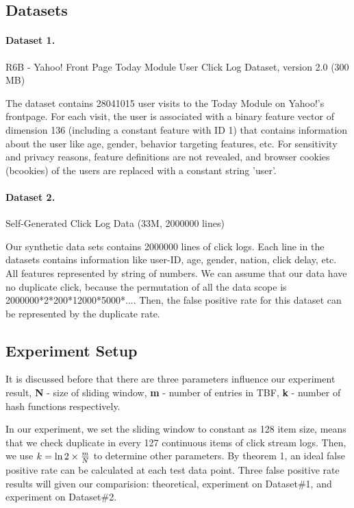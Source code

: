 \documentclass[runningheads,report]{llncs}
\begin{document}
 
\subsection{Datasets}
\paragraph{Dataset 1.}
R6B - Yahoo! Front Page Today Module User Click Log Dataset, version 2.0 (300 MB)

The dataset contains 28041015 user visits to the Today Module on Yahoo!'s frontpage. For each visit, the user is associated with a binary feature vector of dimension 136 (including a constant feature with ID 1) that contains information about the user like age, gender, behavior targeting features, etc. For sensitivity and privacy reasons, feature definitions are not revealed, and browser cookies (bcookies) of the users are replaced with a constant string 'user'\cite{website:yahoodata}.
 
\paragraph{Dataset 2.}
Self-Generated Click Log Data (33M, 2000000 lines)

Our synthetic data sets contains 2000000 lines of click logs. Each line in the datasets contains information like user-ID, age, gender, nation, click delay, etc. All features represented by string of numbers. We can assume that our data have no duplicate click, because the permutation of all the data scope is 2000000*2*200*12000*5000*.... Then, the false positive rate for this dataset can be represented by the duplicate rate.

\subsection{Experiment Setup}

It is discussed before that there are three parameters influence our experiment result, \textbf{N} - size of sliding window, \textbf{m} - number of entries in TBF, \textbf{k} - number of hash functions respectively. 

In our experiment, we set the sliding window to constant as 128 item size, means that we check duplicate in every 127 continuous items of click stream logs. Then, we use $k = \ln 2 \times {m \over N}$ to determine other parameters. By theorem 1, an ideal false positive rate can be calculated at each test data point. Three false positive rate results will given our comparision: theoretical, experiment on Dataset\#1, and experiment on Dataset\#2.
\end{document}
